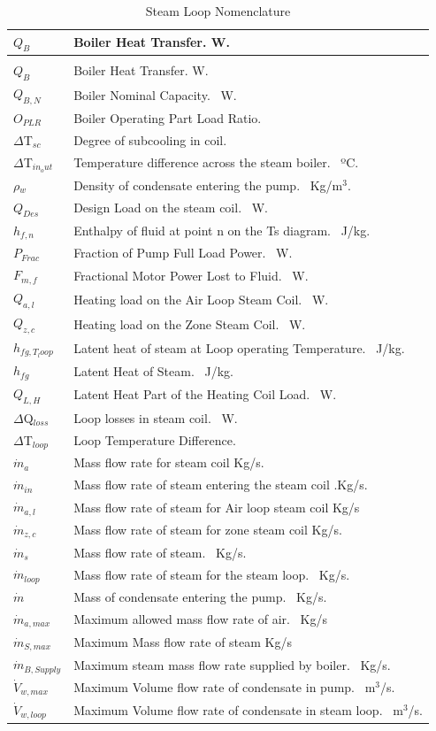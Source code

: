 \begin{longtable}[c]{p{1.0in}p{4.0in}}
\caption{Steam Loop Nomenclature \label{table:steam-loop-nomenclature}} \tabularnewline
\toprule 
\({Q_{B}}\) & Boiler Heat Transfer. W. \tabularnewline
\midrule
\endfirsthead

\caption[]{Steam Loop Nomenclature} \tabularnewline
\toprule 
\({Q_{B}}\) & Boiler Heat Transfer. W. \tabularnewline
\midrule
\endhead

\({Q_{B,N}}\) & Boiler Nominal Capacity.~ W. \tabularnewline
\({O_{PLR}}\) & Boiler Operating Part Load Ratio.~ \tabularnewline
\(\Delta\)T\(_{sc}\) & Degree of subcooling in coil.~ \tabularnewline
\(\Delta\)T\(_{in_out}\) & Temperature difference across the steam boiler.~ ºC. \tabularnewline
\(\rho\)\(_{w}\) & Density of condensate entering the pump.~ Kg/m\(^3\).~ \tabularnewline
\(Q_{Des}\) & Design Load on the steam coil.~ W. \tabularnewline
\(h_{f,n}\) & Enthalpy of fluid at point n on the Ts diagram.~ J/kg. \tabularnewline
\(P_{Frac}\) & Fraction of Pump Full Load Power.~ W. \tabularnewline
\(F_{m,f}\) & Fractional Motor Power Lost to Fluid.~ W. \tabularnewline
\(Q_{a,l}\) & Heating load on the Air Loop Steam Coil.~ W. \tabularnewline
\(Q_{z,c}\) & Heating load on the Zone Steam Coil.~ W. \tabularnewline
\(h_{fg,T_loop}\) & Latent heat of steam at Loop operating Temperature.~ J/kg. \tabularnewline
\(h_{fg}\) & Latent Heat of Steam.~ J/kg. \tabularnewline
\(Q_{L,H}\) & Latent Heat Part of the Heating Coil Load.~ W. \tabularnewline
\(\Delta\)Q\(_{loss}\) & Loop losses in steam coil.~ W. \tabularnewline
\(\Delta\)T\(_{loop}\) & Loop Temperature Difference. \tabularnewline
\(\dot m_{a}\) & Mass flow rate for steam coil Kg/s. \tabularnewline
\(\dot m_{in}\) & Mass flow rate of steam entering the steam coil .Kg/s. \tabularnewline
\(\dot m_{a,l}\) & Mass flow rate of steam for Air loop steam coil Kg/s \tabularnewline
\(\dot m_{z,c}\) & Mass flow rate of steam for zone steam coil Kg/s. \tabularnewline
\(\dot m_{s}\) & Mass flow rate of steam.~ Kg/s. \tabularnewline
\(\dot m_{loop}\) & Mass flow rate of steam for the steam loop.~ Kg/s. \tabularnewline
\(\dot m\) & Mass of condensate entering the pump.~ Kg/s. \tabularnewline
\(\dot m_{a,max}\) & Maximum allowed mass flow rate of air.~ Kg/s \tabularnewline
\(\dot m_{S,max}\) & Maximum Mass flow rate of steam Kg/s \tabularnewline
\(\dot m_{B,Supply}\) & Maximum steam mass flow rate supplied by boiler.~ Kg/s. \tabularnewline
\(\dot V_{w,max}\) & Maximum Volume flow rate of condensate in pump.~ m\(^3\)/s. \tabularnewline
\(\dot V_{w,loop}\) & Maximum Volume flow rate of condensate in steam loop.~ m\(^3\)/s. \tabularnewline

\end{longtable}
